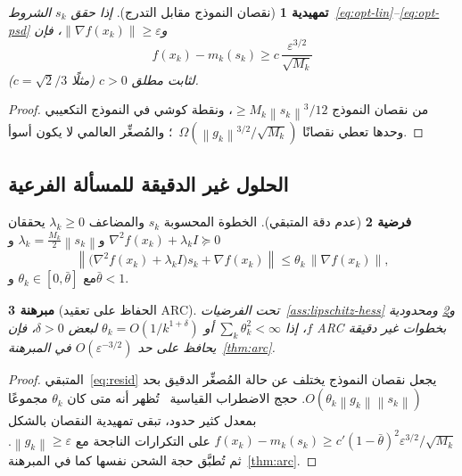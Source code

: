 \documentclass[11pt,a4paper]{article}
\theoremstyle{plain}
\newtheorem{theorem}{مبرهنة}[section]
\newtheorem{lemma}[theorem]{تمهيدية}
\theoremstyle{definition}
\newtheorem{assumption}[theorem]{فرضية}
\newcommand{\norm}[1]{\left\|#1\right\|}
\newcommand{\grad}{\nabla}
\newcommand{\hess}{\nabla^{2}}
\begin{document}
\begin{lemma}[نقصان النموذج مقابل التدرج]
\label{lem:arc-decrease}
إذا حقق $s_{k}$ الشروط~\eqref{eq:opt-lin}--\eqref{eq:opt-psd} و$\norm{\grad f(x_{k})}\ge\varepsilon$، فإن
\begin{equation}
f(x_{k})-m_{k}(s_{k})
\ge
c\,\frac{\varepsilon^{3/2}}{\sqrt{M_{k}}}
\end{equation}
لثابت مطلق $c>0$ (مثلًا $c=\sqrt{2}/3$).
\end{lemma}

\begin{proof}
من نقصان النموذج $\ge M_{k}\norm{s_{k}}^{3}/12$، ونقطة كوشي في النموذج التكعيبي وحدها تعطي نقصانًا $\Omega(\norm{g_{k}}^{3/2}/\sqrt{M_{k}})$~\cite{cartis2011arc}؛ والمُصغِّر العالمي لا يكون أسوأ.
\end{proof}

\subsection{الحلول غير الدقيقة للمسألة الفرعية}

\begin{assumption}[عدم دقة المتبقي]
\label{ass:inexact}
الخطوة المحسوبة $s_{k}$ والمضاعف $\lambda_{k}\ge 0$ يحققان $\hess f(x_{k})+\lambda_{k}I\succeq 0$ و$\lambda_{k}=\tfrac{M_{k}}{2}\norm{s_{k}}$ و
\begin{equation}
\label{eq:resid}
\norm{\bigl(\hess f(x_{k})+\lambda_{k}I\bigr)s_{k}+\grad f(x_{k})}
\le
\theta_{k}\,\norm{\grad f(x_{k})},
\end{equation}
مع $\theta_{k}\in[0,\bar\theta]$ و$\bar\theta<1$.
\end{assumption}

\begin{theorem}[الحفاظ على تعقيد ARC]
\label{thm:inexact}
تحت الفرضيات~\ref{ass:lipschitz-hess} و\ref{ass:inexact} ومحدودية $f$، إذا $\sum_{k}\theta_{k}^{2}<\infty$ أو $\theta_{k}=O(1/k^{1+\delta})$ لبعض $\delta>0$، فإن ARC بخطوات غير دقيقة يحافظ على حد $O(\varepsilon^{-3/2})$ في المبرهنة~\ref{thm:arc}.
\end{theorem}

\begin{proof}
المتبقي~\eqref{eq:resid} يجعل نقصان النموذج يختلف عن حالة المُصغِّر الدقيق بحد $O(\theta_{k}\norm{g_{k}}\norm{s_{k}})$.
حجج الاضطراب القياسية~\cite{cartis2011arc,birgin2017worst} تُظهر أنه متى كان $\theta_{k}$ مجموعًا بمعدل كثير حدود، تبقى تمهيدية النقصان بالشكل
$f(x_{k})-m_{k}(s_{k})\ge c'(1-\bar\theta)^{2}\varepsilon^{3/2}/\sqrt{M_{k}}$ على التكرارات الناجحة مع $\norm{g_{k}}\ge\varepsilon$.
ثم تُطبَّق حجة الشحن نفسها كما في المبرهنة~\ref{thm:arc}.
\end{proof}
\end{document}
